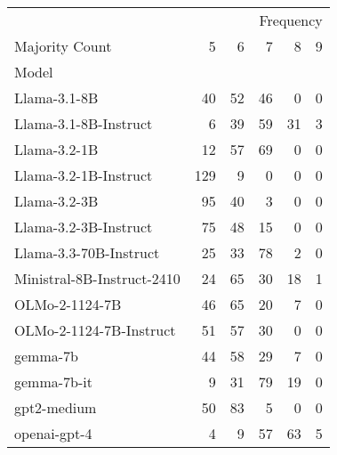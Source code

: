 \begin{tabular}{lrrrrr}
\toprule
 & \multicolumn{5}{r}{Frequency} \\
Majority Count & 5 & 6 & 7 & 8 & 9 \\
Model &  &  &  &  &  \\
\midrule
Llama-3.1-8B & 40 & 52 & 46 & 0 & 0 \\
Llama-3.1-8B-Instruct & 6 & 39 & 59 & 31 & 3 \\
Llama-3.2-1B & 12 & 57 & 69 & 0 & 0 \\
Llama-3.2-1B-Instruct & 129 & 9 & 0 & 0 & 0 \\
Llama-3.2-3B & 95 & 40 & 3 & 0 & 0 \\
Llama-3.2-3B-Instruct & 75 & 48 & 15 & 0 & 0 \\
Llama-3.3-70B-Instruct & 25 & 33 & 78 & 2 & 0 \\
Ministral-8B-Instruct-2410 & 24 & 65 & 30 & 18 & 1 \\
OLMo-2-1124-7B & 46 & 65 & 20 & 7 & 0 \\
OLMo-2-1124-7B-Instruct & 51 & 57 & 30 & 0 & 0 \\
gemma-7b & 44 & 58 & 29 & 7 & 0 \\
gemma-7b-it & 9 & 31 & 79 & 19 & 0 \\
gpt2-medium & 50 & 83 & 5 & 0 & 0 \\
openai-gpt-4 & 4 & 9 & 57 & 63 & 5 \\
\bottomrule
\end{tabular}
